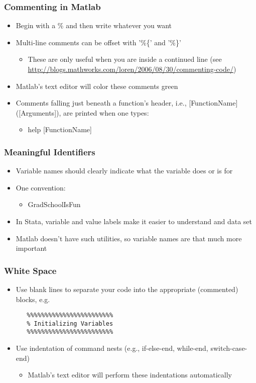 \documentclass[english,xcolor=dvipsnames]{beamer}
\newcommand{\bi}{\begin{itemize}}
\newcommand{\ei}{\end{itemize}}
\begin{document}
\begin{frame}
\frametitle{Commenting in Matlab}

   \bi 
   \item Begin with a \% and then write whatever you want 
   \item Multi-line comments can be offset with '\%\{' and '\%\}'
   		\bi
   		\item These are only useful when you are inside a continued line (see \url{http://blogs.mathworks.com/loren/2006/08/30/commenting-code/})
   		\ei
   \item Matlab's text editor will color these comments green
   \item Comments falling just beneath a function's header, i.e., [FunctionName]([Arguments]), are printed when one types: 
      \bi 
      \item help [FunctionName]
      \ei
   \ei
\end{frame}

\begin{frame}
\frametitle{Meaningful Identifiers}

   \bi 
   \item Variable names should clearly indicate what the variable does or is for
   \item One convention:
      \bi 
      \item GradSchoolIsFun
      \ei
   \item In Stata, variable and value labels make it easier to understand and data set
   \item Matlab doesn't have such utilities, so variable names are that much more important
   \ei
\end{frame}

\begin{frame}[fragile]
\frametitle{White Space}

   \bi 
   \item Use blank lines to separate your code into the appropriate (commented) blocks, e.g.
   \begin{lstlisting}
   %%%%%%%%%%%%%%%%%%%%%%%%
   % Initializing Variables
   %%%%%%%%%%%%%%%%%%%%%%%%
   \end{lstlisting}
   \item Use indentation of command nests (e.g., if-else-end, while-end, switch-case-end) 
      \bi 
      \item Matlab's text editor will perform these indentations automatically
      \ei
   \ei
\end{frame}
\end{document}

